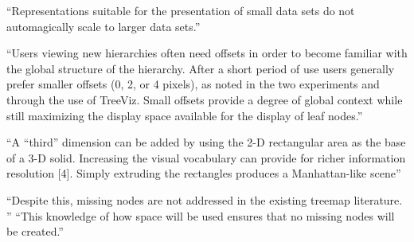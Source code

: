 \enquote{Representations suitable for the presentation of small data sets do not automagically scale to larger data sets.}\cite[161]{johnson1993treemapsPhd}

\enquote{Users viewing new hierarchies often need offsets in order to become familiar with the global structure of the hierarchy. After a short period of use users generally prefer smaller offsets (0, 2, or 4 pixels), as noted in the two experiments and through the use of TreeViz. Small offsets provide a degree of global context while still maximizing the display space available for the display of leaf nodes.}\cite[3]{johnson1992improving}

\enquote{A “third” dimension can be added by using the 2-D rectangular area as the base of a 3-D solid. Increasing the visual vocabulary can provide for richer information resolution [4]. Simply extruding the rectangles produces a Manhattan-like scene}\cite[5]{johnson1992improving}

\enquote{Despite this, missing nodes are not addressed in the existing treemap literature. }\cite[5]{lu2008cascaded}
\enquote{This knowledge of how space will be used ensures that no missing nodes will be created.}\cite[6]{lu2008cascaded}
